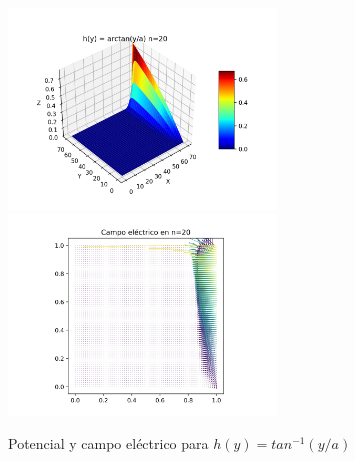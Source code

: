 \documentclass[10pt,journal,compsoc]{IEEEtran}
\begin{document}
\begin{figure}
  \centering
  \includegraphics[width=2.8in]{images/arctan-n20}
  \includegraphics[width=2.8in]{images/arctan-field}
  \caption{Potencial y campo eléctrico para \(h(y) = tan^{-1}(y/a)\)}
  \label{arctan-n20}
\end{figure}
\end{document}
